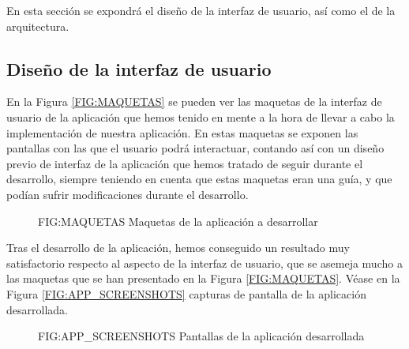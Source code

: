 En esta sección se expondrá el diseño de la interfaz de usuario, así como el de la arquitectura.

\subsection{Diseño de la interfaz de usuario\label{SEC:DISENO_INTERFAZ}}

En la Figura \ref{FIG:MAQUETAS} se pueden ver las maquetas de la interfaz de usuario de la aplicación que hemos tenido en mente a la hora de llevar a cabo
la implementación de nuestra aplicación. En estas maquetas se exponen las pantallas con las que el usuario podrá interactuar, contando así con un diseño 
previo de interfaz de la aplicación que hemos tratado de seguir durante el desarrollo, siempre teniendo en cuenta que estas
maquetas eran una guía, y que podían sufrir modificaciones durante el desarrollo.

\begin{figure}[Maquetas de la aplicación a desarrollar]{FIG:MAQUETAS}
    {Maquetas de la aplicación a desarrollar}
\end{figure}

Tras el desarrollo de la aplicación, hemos conseguido un resultado muy satisfactorio respecto al aspecto de la interfaz de 
usuario, que se asemeja mucho a las maquetas que se han presentado en la Figura \ref{FIG:MAQUETAS}. Véase en la Figura
\ref{FIG:APP_SCREENSHOTS} capturas de pantalla de la aplicación desarrollada.

\begin{figure}[Pantallas de la aplicación desarrollada]{FIG:APP_SCREENSHOTS}
  {Pantallas de la aplicación desarrollada}
\end{figure}


